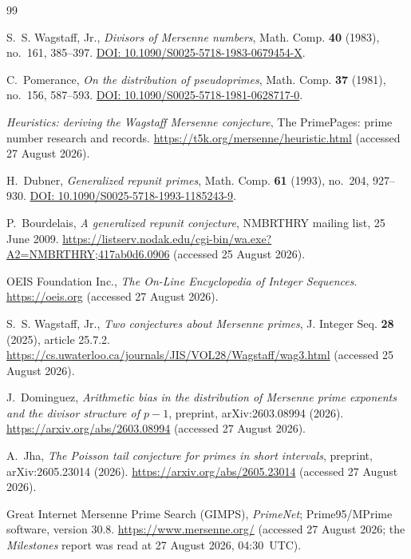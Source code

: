 \documentclass[11pt,a4paper]{article}
\theoremstyle{plain}
\theoremstyle{remark}
\begin{document}
\begin{thebibliography}{99}

 S.~S. Wagstaff, Jr., \emph{Divisors of Mersenne
numbers}, Math. Comp. \textbf{40} (1983), no.~161, 385--397.
\href{https://doi.org/10.1090/S0025-5718-1983-0679454-X}{DOI:
10.1090/S0025-5718-1983-0679454-X}.

 C.~Pomerance, \emph{On the distribution of
pseudoprimes}, Math. Comp. \textbf{37} (1981), no.~156, 587--593.
\href{https://doi.org/10.1090/S0025-5718-1981-0628717-0}{DOI:
10.1090/S0025-5718-1981-0628717-0}.

 \emph{Heuristics: deriving the Wagstaff Mersenne conjecture}, The
PrimePages: prime number research and records.
\url{https://t5k.org/mersenne/heuristic.html} (accessed 27 August 2026).

 H.~Dubner, \emph{Generalized repunit primes}, Math. Comp.
\textbf{61} (1993), no.~204, 927--930.
\href{https://doi.org/10.1090/S0025-5718-1993-1185243-9}{DOI:
10.1090/S0025-5718-1993-1185243-9}.

 P.~Bourdelais, \emph{A generalized repunit
conjecture}, NMBRTHRY mailing list, 25 June 2009.
\url{https://listserv.nodak.edu/cgi-bin/wa.exe?A2=NMBRTHRY;417ab0d6.0906}
(accessed 25 August 2026).

 OEIS Foundation Inc., \emph{The On-Line Encyclopedia of Integer
Sequences}. \url{https://oeis.org} (accessed 27 August 2026).

 S.~S. Wagstaff, Jr., \emph{Two conjectures about Mersenne
primes}, J. Integer Seq. \textbf{28} (2025), article 25.7.2.
\url{https://cs.uwaterloo.ca/journals/JIS/VOL28/Wagstaff/wag3.html}
(accessed 25 August 2026).

 J.~Dominguez, \emph{Arithmetic bias in the distribution
of Mersenne prime exponents and the divisor structure of $p-1$}, preprint,
arXiv:2603.08994 (2026). \url{https://arxiv.org/abs/2603.08994}
(accessed 27 August 2026).

 A.~Jha, \emph{The Poisson tail conjecture for primes in short
intervals}, preprint, arXiv:2605.23014 (2026).
\url{https://arxiv.org/abs/2605.23014} (accessed 27 August 2026).

 Great Internet Mersenne Prime Search (GIMPS), \emph{PrimeNet};
Prime95/MPrime software, version 30.8. \url{https://www.mersenne.org/}
(accessed 27 August 2026; the \emph{Milestones} report was read at
27 August 2026, 04:30~UTC).


\end{thebibliography}
\end{document}
